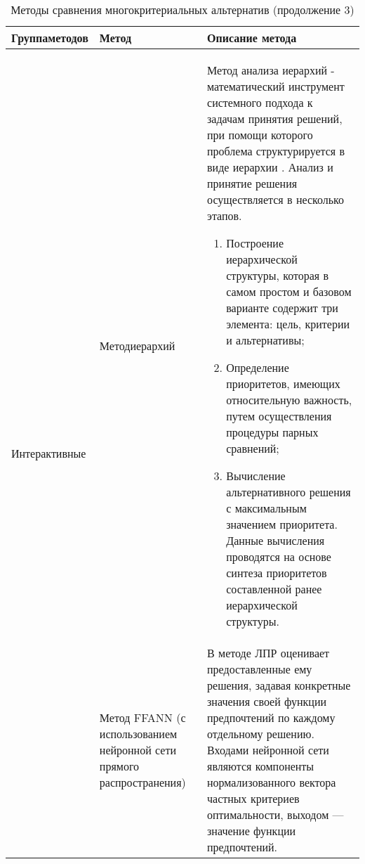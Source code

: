 \begin{table}[H]
	\centering
	\caption{Методы сравнения многокритериальных альтернатив (продолжение 3)}
	\label{mko_table_3}
	\begin{tabular}{|p{3.3cm}|p{2.4cm}|p{9.5cm}|}
		\hline
		\textbf{Группа\linebreak методов} & \textbf{Метод} & \textbf{Описание метода} \\
		\hline
		\multirow{2}{3.3cm}{Интерактивные} & Метод иерархий & Метод анализа иерархий - математический инструмент системного подхода к задачам принятия решений, при помощи которого проблема структурируется в виде иерархии \cite{mko_methods}. Анализ и принятие решения осуществляется в несколько этапов.\begin{enumerate}
			\item Построение иерархической структуры, которая в самом
			простом и базовом варианте содержит три элемента: цель,
			критерии и альтернативы;
			\item Определение приоритетов, имеющих относительную важность, путем осуществления процедуры парных сравнений;
			\item Вычисление альтернативного решения с
			максимальным значением приоритета. Данные вычисления
			проводятся на основе синтеза приоритетов составленной
			ранее иерархической структуры.
		\end{enumerate}\\
		\cline{2-3} & Метод FFANN (с использованием нейронной сети прямого распространения) & В методе ЛПР оценивает предоставленные ему решения, задавая конкретные значения своей функции предпочтений по каждому отдельному решению. Входами нейронной сети являются компоненты нормализованного вектора частных критериев оптимальности, выходом --- значение функции предпочтений.\\
		\hline
	\end{tabular}
\end{table}

